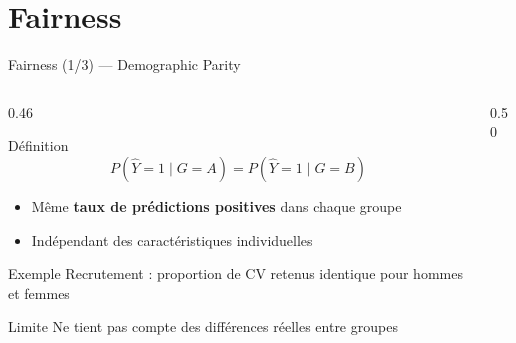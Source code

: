 \documentclass[aspectratio=169, 10pt]{beamer}
\begin{document}
\section{Fairness}


\begin{frame}{Fairness (1/3) --- Demographic Parity}
  \begin{columns}[T]
    \begin{column}{0.46\textwidth}
      \begin{block}{Définition}
        \[ P(\hat{Y}{=}1 \mid G{=}A) = P(\hat{Y}{=}1 \mid G{=}B) \]
      \end{block}
      \vspace{-4pt}
      \begin{itemize}
        \item Même \textbf{taux de prédictions positives}
              dans chaque groupe
        \item Indépendant des caractéristiques individuelles
      \end{itemize}
      \begin{exampleblock}{Exemple}
        Recrutement : proportion de CV retenus
        identique pour hommes et femmes
      \end{exampleblock}
      \begin{alertblock}{Limite}
        Ne tient pas compte des différences
        réelles entre groupes
      \end{alertblock}
    \end{column}
    \begin{column}{0.50\textwidth}
      \begin{center}
      \end{center}
    \end{column}
  \end{columns}
\end{frame}
\end{document}
